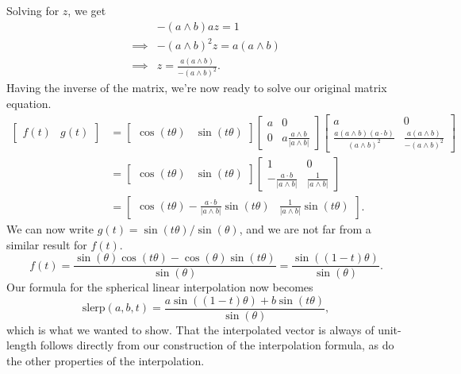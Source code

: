 \documentclass{article}
\begin{document}
Solving for $z$, we get
\begin{align*}
 & -(a\wedge b)az = 1 \\
\implies& -(a\wedge b)^2z = a(a\wedge b) \\
\implies& z = \frac{a(a\wedge b)}{-(a\wedge b)^2}.
\end{align*}
Having the inverse of the matrix, we're now ready to solve our original matrix equation.
\begin{align*}
\left[\begin{array}{cc}f(t)&g(t)\end{array}\right]
 &= \left[\begin{array}{cc}\cos(t\theta)&\sin(t\theta)\end{array}\right]
\left[\begin{array}{cc}a&0\\0&a\frac{a\wedge b}{|a\wedge b|}\end{array}\right]
\left[\begin{array}{cc}a&0\\\frac{a(a\wedge b)(a\cdot b)}{(a\wedge b)^2}&
\frac{a(a\wedge b)}{-(a\wedge b)^2}\end{array}\right] \\
 &= \left[\begin{array}{cc}\cos(t\theta)&\sin(t\theta)\end{array}\right]
\left[\begin{array}{cc}1&0\\-\frac{a\cdot b}{|a\wedge b|}&\frac{1}{|a\wedge b|}\end{array}\right] \\
 &= \left[\begin{array}{cc}\cos(t\theta)-\frac{a\cdot b}{|a\wedge b|}\sin(t\theta)
 & \frac{1}{|a\wedge b|}\sin(t\theta)\end{array}\right].
\end{align*}
We can now write $g(t)=\sin(t\theta)/\sin(\theta)$, and we are not
far from a similar result for $f(t)$.
\begin{equation*}
f(t) = \frac{\sin(\theta)\cos(t\theta)-\cos(\theta)\sin(t\theta)}{\sin(\theta)} =
 \frac{\sin((1-t)\theta)}{\sin(\theta)}.
\end{equation*}
Our formula for the spherical linear interpolation now becomes
\begin{equation*}
\mbox{slerp}(a,b,t) = \frac{a\sin((1-t)\theta)+b\sin(t\theta)}{\sin(\theta)},
\end{equation*}
which is what we wanted to show.
That the interpolated vector is always of unit-length follows directly
from our construction of the interpolation formula, as do the other properties
of the interpolation.
\end{document}
